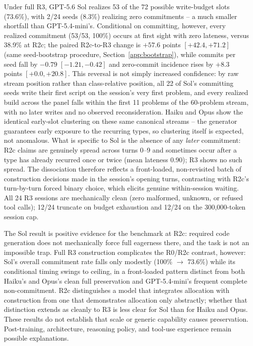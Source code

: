 \documentclass{article}
\begin{document}
Under full R3, GPT-5.6 Sol realizes 53 of the 72 possible write-budget slots
(73.6\%), with 2/24 seeds (8.3\%) realizing zero commitments -- a much smaller
shortfall than GPT-5.4-mini's. Conditional on committing, however, every
realized commitment (53/53, 100\%) occurs at first sight with zero lateness,
versus 38.9\% at R2c; the paired R2c-to-R3 change is $+57.6$ points
$[+42.4,+71.2]$ (same seed-bootstrap procedure, Section~\ref{app:bootstrap}),
while commits per seed fall by $-0.79$ $[-1.21,-0.42]$ and zero-commit
incidence rises by $+8.3$ points $[+0.0,+20.8]$. This reversal is not simply
increased confidence: by raw stream position rather than class-relative
position, all 22 of Sol's committing seeds write their first script on the
session's very first problem, and every realized build across the panel falls
within the first 11 problems of the 60-problem stream, with no later writes
and no observed reconsideration. Haiku and Opus show the identical early-slot
clustering on these same canonical streams -- the generator guarantees early
exposure to the recurring types, so clustering itself is expected, not
anomalous. What is specific to Sol is the absence of any \emph{later}
commitment: R2c claims are genuinely spread across turns 0--9 and sometimes
occur after a type has already recurred once or twice (mean lateness 0.90);
R3 shows no such spread. The dissociation therefore reflects a front-loaded,
non-revisited batch of construction decisions made in the session's opening
turns, contrasting with R2c's turn-by-turn forced binary choice, which elicits
genuine within-session waiting. All 24 R3 sessions are mechanically clean
(zero malformed, unknown, or refused tool calls); 12/24 truncate on budget
exhaustion and 12/24 on the 300,000-token session cap.

The Sol result is positive evidence for the benchmark at R2c: required code
generation does not mechanically force full eagerness there, and the task is
not an impossible trap. Full R3 construction complicates the R0/R2c contrast,
however: Sol's overall commitment rate falls only modestly (100\%
$\rightarrow$ 73.6\%) while its conditional timing swings to ceiling, in a
front-loaded pattern distinct from both Haiku's and Opus's clean full
preservation and GPT-5.4-mini's frequent complete non-commitment. R2c
distinguishes a model that integrates allocation with construction from one
that demonstrates allocation only abstractly; whether that distinction
extends as cleanly to R3 is less clear for Sol than for Haiku and Opus. These
results do not establish that scale or generic capability causes
preservation. Post-training, architecture, reasoning policy, and tool-use
experience remain possible explanations.
\end{document}
